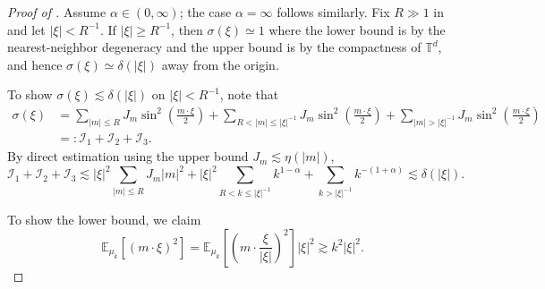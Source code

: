 \documentclass{article}
\numberwithin{equation}{section}
\begin{document}
\begin{proof}[Proof of ]
Assume $\alpha \in (0,\infty)$; the case $\alpha = \infty$ follows similarly. Fix $R \gg 1$ in  and let $|\xi| < R^{-1}$. If $|\xi| \geq R^{-1}$, then $\sigma(\xi) \simeq 1$ where the lower bound is by the nearest-neighbor degeneracy and the upper bound is by the compactness of $\mathbb{T}^d$, and hence $\sigma(\xi) \simeq \delta(|\xi|)$ away from the origin.

To show $\sigma(\xi) \lesssim \delta(|\xi|)$ on $|\xi| < R^{-1}$, note that
\begin{equation*}
\begin{split}
\sigma(\xi) &= \sum_{|m| \leq R} J_m \sin^2 \left(\frac{m\cdot \xi}{2}\right) + \sum_{R<|m| \leq |\xi|^{-1}} J_m \sin^2 \left(\frac{m\cdot \xi}{2}\right) + \sum_{|m| > |\xi|^{-1}} J_m \sin^2 \left(\frac{m\cdot \xi}{2}\right)\\
    &=: \mathscr{I}_1 + \mathscr{I}_2 + \mathscr{I}_3.    
\end{split}
\end{equation*}
By direct estimation using the upper bound $J_{m} \lesssim \eta(|m|)$,
\begin{equation*}
\mathscr{I}_1 + \mathscr{I}_2 + \mathscr{I}_3 \lesssim |\xi|^2 \sum_{|m| \leq R} J_{m} |m|^2 + |\xi|^2 \sum_{R < k \leq |\xi|^{-1}} k^{1-\alpha} + \sum_{k>|\xi|^{-1}} k^{-(1+\alpha)} \lesssim \delta(|\xi|).
\end{equation*}

To show the lower bound, we claim
\begin{equation}\label{count2}
    \mathbb{E}_{\mu_{k}} [(m \cdot \xi)^2] =  \mathbb{E}_{\mu_k} \left[\left(m \cdot \frac{\xi}{|\xi|}\right)^2\right] |\xi|^{2} \gtrsim k^2 |\xi|^2.
\end{equation}


\end{proof}
\end{document}
